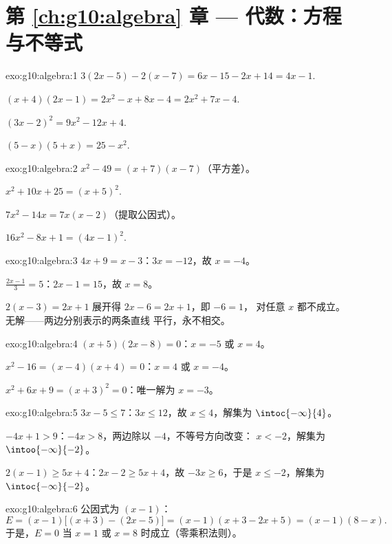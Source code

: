 \section*{第 \ref{ch:g10:algebra} 章 --- 代数：方程与不等式}

\begin{solution}{exo:g10:algebra:1}
$3(2x-5) - 2(x-7) = 6x - 15 - 2x + 14 = 4x - 1$.

$(x+4)(2x-1) = 2x^2 - x + 8x - 4 = 2x^2 + 7x - 4$.

$(3x-2)^2 = 9x^2 - 12x + 4$.

$(5-x)(5+x) = 25 - x^2$.
\end{solution}

\begin{solution}{exo:g10:algebra:2}
$x^2 - 49 = (x+7)(x-7)$（平方差）。

$x^2 + 10x + 25 = (x+5)^2$.

$7x^2 - 14x = 7x(x - 2)$（提取公因式）。

$16x^2 - 8x + 1 = (4x - 1)^2$.
\end{solution}

\begin{solution}{exo:g10:algebra:3}
$4x + 9 = x - 3$：$3x = -12$，故 $x = -4$。

$\frac{2x-1}{3} = 5$：$2x - 1 = 15$，故 $x = 8$。

$2(x-3) = 2x + 1$ 展开得 $2x - 6 = 2x + 1$，即 $-6 = 1$，
对任意 $x$ 都不成立。无解——两边分别表示的两条直线
平行，永不相交。
\end{solution}

\begin{solution}{exo:g10:algebra:4}
$(x+5)(2x-8) = 0$：$x = -5$ 或 $x = 4$。

$x^2 - 16 = (x-4)(x+4) = 0$：$x = 4$ 或 $x = -4$。

$x^2 + 6x + 9 = (x+3)^2 = 0$：唯一解为 $x = -3$。
\end{solution}

\begin{solution}{exo:g10:algebra:5}
$3x - 5 \leq 7$：$3x \leq 12$，故 $x \leq 4$，解集为
$\intoc{-\infty}{4}$。

$-4x + 1 > 9$：$-4x > 8$，两边除以 $-4$，不等号方向改变：
$x < -2$，解集为 $\intoo{-\infty}{-2}$。

$2(x-1) \geq 5x + 4$：$2x - 2 \geq 5x + 4$，故 $-3x \geq 6$，于是
$x \leq -2$，解集为 $\intoc{-\infty}{-2}$。
\end{solution}

\begin{solution}{exo:g10:algebra:6}
公因式为 $(x-1)$：
\[
E = (x-1)\bigl[(x+3) - (2x - 5)\bigr] = (x-1)(x + 3 - 2x + 5)
= (x-1)(8 - x).
\]
于是，$E = 0$ 当 $x = 1$ 或 $x = 8$ 时成立（零乘积法则）。
\end{solution}

